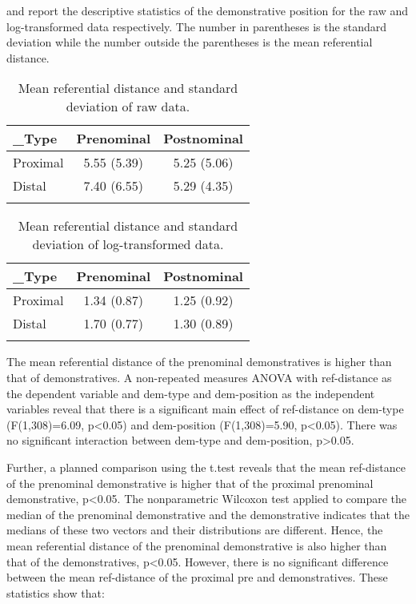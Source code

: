 \documentclass[output=paper,
modfonts
]{langscibook}
\begin{document}
 and  report the descriptive statistics of the demonstrative position for the raw and log-transformed data respectively. The number in parentheses is the standard deviation while the number outside the parentheses is the mean referential distance.

\begin{table}
\begin{tabularx}{.75\textwidth}{XSS}
\lsptoprule
{\bfseries {}\_Type} & {\bfseries Prenominal} & {\bfseries Postnominal}\\
\midrule
{ Proximal} & { 5.55 (5.39)} & { 5.25 (5.06)}\\
{ Distal} & { 7.40 (6.55)} & { 5.29 (4.35)}\\
\lspbottomrule
\end{tabularx}
\caption{Mean referential distance and standard deviation of raw data.}
\label{tab:mwamzandi:4}
\end{table}

\begin{table}
\begin{tabularx}{.75\textwidth}{XSS}
\lsptoprule
{\bfseries {}\_Type} & {\bfseries Prenominal} & {\bfseries Postnominal}\\
\midrule
{ Proximal} & { 1.34 (0.87)} & { 1.25 (0.92)}\\
{ Distal} & { 1.70 (0.77)} & { 1.30 (0.89)}\\
\lspbottomrule
\end{tabularx}
\caption{Mean referential distance and standard deviation of log-transformed data.}
\label{tab:mwamzandi:5}
\end{table}

The mean referential distance of the prenominal demonstratives is higher than that of  demonstratives. A non-repeated measures ANOVA with ref-distance as the dependent variable and dem-type and dem-position as the independent variables reveal that there is a significant main effect of ref-distance on dem-type (F(1,308)=6.09, p<0.05) and dem-position (F(1,308)=5.90, p<0.05). There was no significant interaction between dem-type and dem-position, p>0.05.

Further, a planned comparison using the t.test reveals that the mean ref-distance of the  prenominal demonstrative is higher that of the proximal prenominal demonstrative, p<0.05. The nonparametric Wilcoxon test applied to compare the median of the  prenominal demonstrative and the   demonstrative indicates that the medians of these two vectors and their distributions are different. Hence, the mean referential distance of the  prenominal demonstrative is also higher than that of the   demonstratives, p<0.05. However, there is no significant difference between the mean ref-distance of the proximal pre and  demonstratives. These statistics show that:
\end{document}
